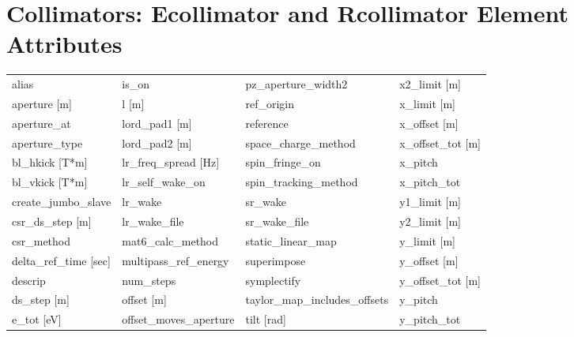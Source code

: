  \section{Collimators: Ecollimator and Rcollimator Element Attributes}
 \label{s:list.collimator}
 
 \begin{tabular}{llll} \toprule
alias                            & is_on                            & pz_aperture_width2               & x2_limit [m]                     \\
aperture [m]                     & l [m]                            & ref_origin                       & x_limit [m]                      \\
aperture_at                      & lord_pad1 [m]                    & reference                        & x_offset [m]                     \\
aperture_type                    & lord_pad2 [m]                    & space_charge_method              & x_offset_tot [m]                 \\
bl_hkick [T*m]                   & lr_freq_spread [Hz]              & spin_fringe_on                   & x_pitch                          \\
bl_vkick [T*m]                   & lr_self_wake_on                  & spin_tracking_method             & x_pitch_tot                      \\
create_jumbo_slave               & lr_wake                          & sr_wake                          & y1_limit [m]                     \\
csr_ds_step [m]                  & lr_wake_file                     & sr_wake_file                     & y2_limit [m]                     \\
csr_method                       & mat6_calc_method                 & static_linear_map                & y_limit [m]                      \\
delta_ref_time [sec]             & multipass_ref_energy             & superimpose                      & y_offset [m]                     \\
descrip                          & num_steps                        & symplectify                      & y_offset_tot [m]                 \\
ds_step [m]                      & offset [m]                       & taylor_map_includes_offsets      & y_pitch                          \\
e_tot [eV]                       & offset_moves_aperture            & tilt [rad]                       & y_pitch_tot                      \\

\end{tabular}
